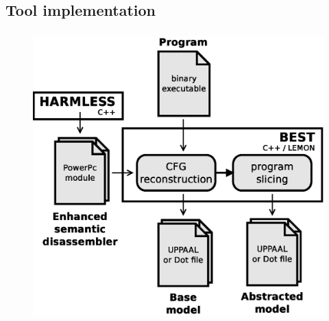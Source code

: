 \documentclass{beamer}
\begin{document}
\begin{frame}
        
      
  \end{frame}
  
  \subsection{Tool implementation}
  \begin{frame}
    \frametitle{\secname}
    \framesubtitle{\subsecname}

    \begin{figure}
      \centering
      \includegraphics[height=.7\textheight]{fig/archi.eps}
    \end{figure}
  \end{frame}
\end{document}
